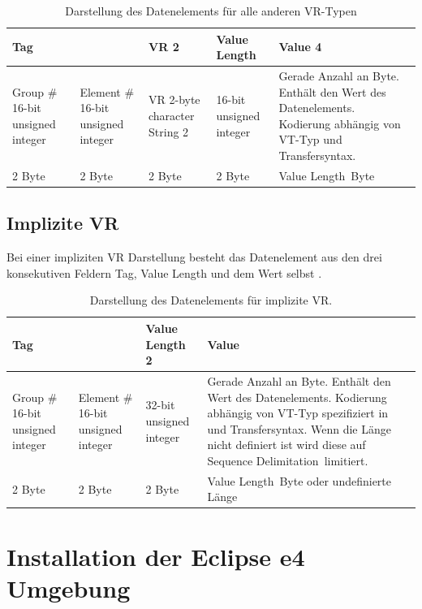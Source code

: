 \begin{table}
	\begin{tabularx}{\textwidth}{|X|X|X|X|p{12cm}|}
	\toprule \hline
	\multicolumn{2}{|l|}{\textbf{Tag}} & \textbf{VR} 2 & \textbf{Value Length} & \textbf{Value} 4 \\ \hline
	Group \# 16-bit unsigned integer & Element \# 16-bit unsigned integer & VR 2-byte character String 2 & 16-bit unsigned integer & Gerade Anzahl an Byte. Enthält den Wert des Datenelements. Kodierung abhängig von VT-Typ und Transfersyntax. \\ \hline
	2 Byte & 2 Byte & 2 Byte & 2 Byte & \glqq Value Length\grqq\ Byte \\ \hline
	\bottomrule
	\end{tabularx}
    \caption {Darstellung des Datenelements für alle anderen VR-Typen}
    \label{table:appendix_explizit_else}
\end{table}

\section{Implizite VR}

Bei einer impliziten VR Darstellung besteht das Datenelement aus den drei konsekutiven Feldern Tag, Value Length und dem Wert selbst \cite[7.1.3]{dicom:structure}.

\begin{table}
	\begin{tabularx}{\textwidth}{|X|X|X|p{12cm}|}
	\toprule \hline
	\multicolumn{2}{|l|}{\textbf{Tag}} & \textbf{Value Length} 2 & \textbf{Value} \\ \hline
	Group \# 16-bit unsigned integer & Element \# 16-bit unsigned integer & 32-bit unsigned integer & Gerade Anzahl an Byte. Enthält den Wert des Datenelements. Kodierung abhängig von VT-Typ spezifiziert in \cite{dicom:dd} und Transfersyntax. Wenn die Länge nicht definiert ist wird diese auf \glqq Sequence Delimitation\grqq\ limitiert. \\ \hline
	2 Byte & 2 Byte & 2 Byte & \glqq Value Length\grqq\ Byte oder undefinierte Länge \\ \hline
	
	\bottomrule
	
	\end{tabularx}
    \caption {Darstellung des Datenelements für implizite VR.}
    \label{table:appendix_implizit}
\end{table}


\chapter{Installation der Eclipse e4 Umgebung} \label{install_eclipse}

